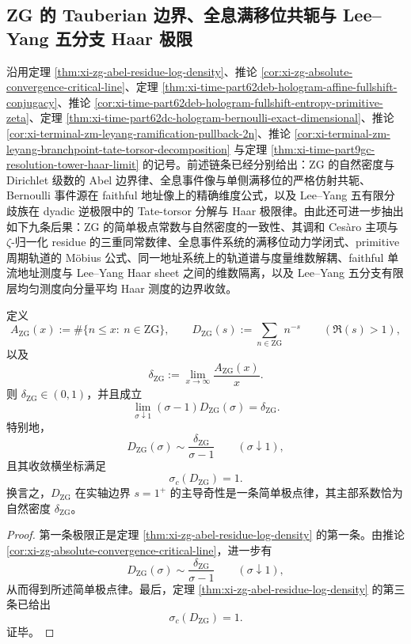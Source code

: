 \subsection{ZG 的 Tauberian 边界、全息满移位共轭与 Lee--Yang 五分支 Haar 极限}\label{subsec:conclusion-zg-hologram-leyang-residue-fullshift-haar}
沿用定理 \ref{thm:xi-zg-abel-residue-log-density}、推论 \ref{cor:xi-zg-absolute-convergence-critical-line}、定理 \ref{thm:xi-time-part62deb-hologram-affine-fullshift-conjugacy}、推论 \ref{cor:xi-time-part62deb-hologram-fullshift-entropy-primitive-zeta}、定理 \ref{thm:xi-time-part62dc-hologram-bernoulli-exact-dimensional}、推论 \ref{cor:xi-terminal-zm-leyang-ramification-pullback-2n}、推论 \ref{cor:xi-terminal-zm-leyang-branchpoint-tate-torsor-decomposition} 与定理 \ref{thm:xi-time-part9gc-resolution-tower-haar-limit} 的记号。前述链条已经分别给出：\(\mathrm{ZG}\) 的自然密度与 Dirichlet 级数的 Abel 边界律、全息事件像与单侧满移位的严格仿射共轭、Bernoulli 事件源在 faithful 地址像上的精确维度公式，以及 Lee--Yang 五有限分歧族在 dyadic 逆极限中的 Tate-torsor 分解与 Haar 极限律。由此还可进一步抽出如下九条后果：\(\mathrm{ZG}\) 的简单极点常数与自然密度的一致性、其调和 Ces\`aro 主项与 \(\zeta\)-归一化 residue 的三重同常数律、全息事件系统的满移位动力学闭式、primitive 周期轨道的 Möbius 公式、同一地址系统上的轨道谱与度量维数解耦、faithful 单流地址测度与 Lee--Yang Haar sheet 之间的维数隔离，以及 Lee--Yang 五分支有限层均匀测度向分量平均 Haar 测度的边界收敛。

\begin{theorem}[ZG 的 Dirichlet 级数在 \texorpdfstring{$s=1^+$}{s=1+} 的简单极点律，其主部系数等于自然密度]\label{thm:conclusion-zg-dirichlet-simple-pole-density}
定义
\[
A_{\mathrm{ZG}}(x):=\#\{n\le x:\ n\in \mathrm{ZG}\},
\qquad
D_{\mathrm{ZG}}(s):=\sum_{n\in \mathrm{ZG}}n^{-s}
\qquad(\Re(s)>1),
\]
以及
\[
\delta_{\mathrm{ZG}}:=\lim_{x\to\infty}\frac{A_{\mathrm{ZG}}(x)}{x}.
\]
则 \(\delta_{\mathrm{ZG}}\in(0,1)\)，并且成立
\[
\boxed{\;
\lim_{\sigma\downarrow 1}(\sigma-1)D_{\mathrm{ZG}}(\sigma)=\delta_{\mathrm{ZG}}.\;}
\]
特别地，
\[
\boxed{\;
D_{\mathrm{ZG}}(\sigma)\sim \frac{\delta_{\mathrm{ZG}}}{\sigma-1}
\qquad(\sigma\downarrow 1),\;}
\]
且其收敛横坐标满足
\[
\boxed{\;
\sigma_c(D_{\mathrm{ZG}})=1.\;}
\]
换言之，\(D_{\mathrm{ZG}}\) 在实轴边界 \(s=1^+\) 的主导奇性是一条简单极点律，其主部系数恰为自然密度 \(\delta_{\mathrm{ZG}}\)。
\end{theorem}
\begin{proof}
第一条极限正是定理 \ref{thm:xi-zg-abel-residue-log-density} 的第一条。由推论 \ref{cor:xi-zg-absolute-convergence-critical-line}，进一步有
\[
D_{\mathrm{ZG}}(\sigma)\sim \frac{\delta_{\mathrm{ZG}}}{\sigma-1}
\qquad(\sigma\downarrow 1),
\]
从而得到所述简单极点律。最后，定理 \ref{thm:xi-zg-abel-residue-log-density} 的第三条已给出
\[
\sigma_c(D_{\mathrm{ZG}})=1.
\]
证毕。
\end{proof}

